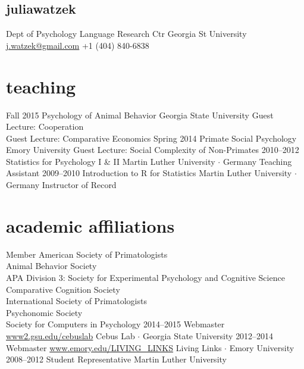 \documentclass[]{friggeri-cv}
\begin{document}
\begin{aside}
  \section{{\normalfont julia}watzek}
    Dept of Psychology
    Language Research Ctr
    Georgia St University
    ~
    \href{mailto:j.watzek@gmail.com}{j.watzek@gmail.com}
    +1 (404) 840-6838
\end{aside}

\section{teaching}

\begin{entrylist}
  \entry
    {Fall 2015}
    {Psychology of Animal Behavior}
    {Georgia State University}
    {Guest Lecture: Cooperation\\
    Guest Lecture: Comparative Economics}
  \entry
    {Spring 2014}
    {Primate Social Psychology}
    {Emory University}
    {Guest Lecture: Social Complexity of Non-Primates}
  \entry
    {2010--2012}
    {Statistics for Psychology I \& II}
    {Martin Luther University $\cdot$ Germany}
    {Teaching Assistant}
  \entry
    {2009--2010}
    {Introduction to R for Statistics}
    {Martin Luther University $\cdot$ Germany}
    {Instructor of Record}
\end{entrylist}


\newpage
\thispagestyle{fancy}

\section{academic affiliations}

\begin{entrylist}
  \entry
    {}
    {Member}
    {}
    {
    American Society of Primatologists\\
    Animal Behavior Society\\
    APA Division 3: Society for Experimental Psychology and Cognitive Science\\
    Comparative Cognition Society\\
    International Society of Primatologists\\
    Psychonomic Society\\
    Society for Computers in Psychology
    }
  \entry
    {2014--2015}
    {Webmaster}
    {\href{http://www2.gsu.edu/cebuslab}{www2.gsu.edu/cebuslab}}
    {Cebus Lab $\cdot$ Georgia State University}
  \entry
    {2012--2014}
    {Webmaster}
    {\href{http://www.emory.edu/LIVING_LINKS}{www.emory.edu/LIVING\_LINKS}}
    {Living Links $\cdot$ Emory University}
  \entry
    {2008--2012}
    {Student Representative}
    {}
    {Martin Luther University}
\end{entrylist}
\end{document}
